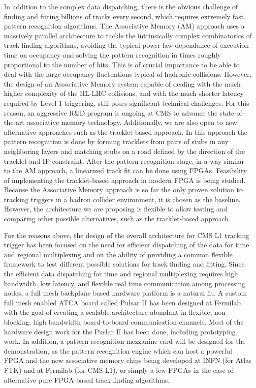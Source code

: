 	In addition to the complex data dispatching, there is the obvious challenge of finding and fitting billions of tracks every second, which requires extremely fast pattern recognition algorithms. The Associative Memory (AM) approach uses a massively parallel architecture to tackle the intrinsically complex combinatorics of track finding algorithms, avoiding the typical power law dependance of execution time on occupancy and solving the pattern recognition in times roughly proportional to the number of hits. This is of crucial importance to be able to deal with the large occupancy fluctuations typical of hadronic collisions. However, the design of an Associative Memory system capable of dealing with the much higher complexity of the HL-LHC collisions, and with the much shorter latency required by Level 1 triggering, still poses significant technical challenges. For this reason, an aggressive R\&D program is ongoing at CMS to advance the state-of-the-art associative memory technology. Additionally, we are also open to new alternative approaches such as the tracklet-based approach. In this approach the pattern recognition is done by forming tracklets from pairs of stubs in any neighboring layers and matching stubs on a road defined by the direction of the tracklet and IP constraint. After the pattern recognition stage, in a way similar to the AM approach, a linearized track fit can be done using FPGAs. Feasibility of implementing the tracklet-based approach in modern FPGA is being studied. Because the Associative Memory approach is so far the only proven solution to tracking triggers in a hadron collider environment, it is chosen as the baseline. However, the architecture we are proposing is flexible to allow testing and comparing other possible alternatives, such as the tracklet-based approach.

	For the reasons above, the design of the overall architecture for CMS L1 tracking trigger has been focused on the need for efficient dispatching of the data for time and regional multiplexing and on the ability of providing a common flexible framework to test different possible solutions for track finding and fitting. Since the efficient data dispatching for time and regional multiplexing requires high bandwidth, low latency, and flexible real time communication among processing nodes, a full mesh backplane based hardware platform is a natural fit. A custom full mesh enabled ATCA board called Pulsar II has been designed at Fermilab with the goal of creating a scalable architecture abundant in flexible, non-blocking, high bandwidth board-to-board communication channels. Most of the hardware design work for the Puslar II has been done, including prototyping work. In addition, a pattern recognition mezzanine card will be designed for the demonstration, as the pattern recognition engine which can host a powerful FPGA and the new associative memory chips being developed at INFN (for Atlas FTK) and at Fermilab (for CMS L1), or simply a few FPGAs in the case of alternative pure FPGA-based track finding algorithms.  

